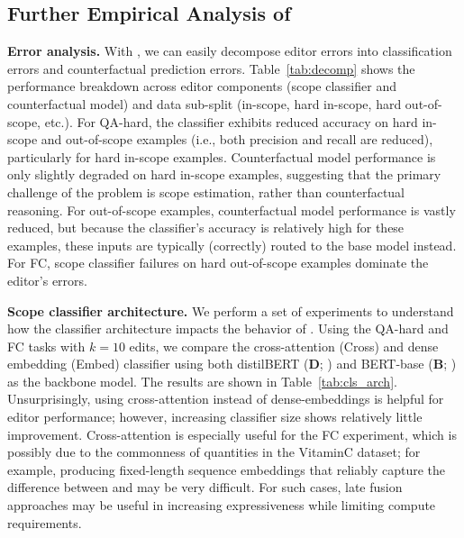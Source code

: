 \documentclass{article}
\begin{document}
\subsection{Further Empirical Analysis of {\name}}
\textbf{Error analysis.}
With {\name}, we can easily decompose editor errors into classification errors and counterfactual prediction errors. Table~\ref{tab:decomp} shows the performance breakdown across editor components (scope classifier and counterfactual model) and data sub-split (in-scope, hard in-scope, hard out-of-scope, etc.). For QA-hard, the classifier exhibits reduced accuracy on hard in-scope and out-of-scope examples (i.e., both precision and recall are reduced), particularly for hard in-scope examples. Counterfactual model performance is only slightly degraded on hard in-scope examples, suggesting that the primary challenge of the problem is scope estimation, rather than counterfactual reasoning. For out-of-scope examples, counterfactual model performance is vastly reduced, but because the classifier's accuracy is relatively high for these examples, these inputs are typically (correctly) routed to the base model instead. For FC, scope classifier failures on hard out-of-scope examples dominate the editor's errors.

\textbf{Scope classifier architecture.}
We perform a set of experiments to understand how the classifier architecture impacts the behavior of {\name}. Using the QA-hard and FC tasks with $k=10$ edits, we compare the cross-attention (Cross) and dense embedding (Embed) classifier using both distilBERT (\textbf{D}; \citep{Sanh2019DistilBERTAD}) and BERT-base (\textbf{B}; \citep{devlin2019bert}) as the backbone model. The results are shown in Table~\ref{tab:cls_arch}. Unsurprisingly, using cross-attention instead of dense-embeddings is helpful for editor performance; however, increasing classifier size shows relatively little improvement. Cross-attention is especially useful for the FC experiment, which is possibly due to the commonness of quantities in the VitaminC dataset; for example, producing fixed-length sequence embeddings that reliably capture the difference between  and 
may be very difficult. For such cases, late fusion approaches \citep{khattab2020colbert} may be useful in increasing expressiveness while limiting compute requirements.
\end{document}
